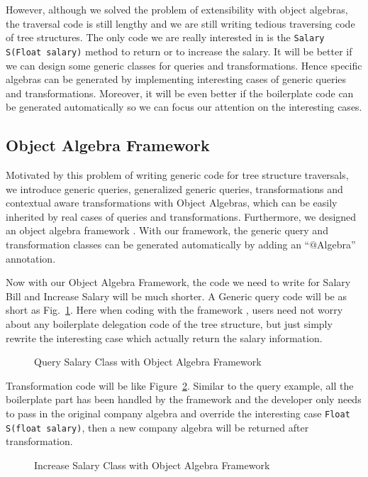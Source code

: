 However, although we solved the problem of extensibility with object algebras, the traversal code is still lengthy and we are still writing tedious traversing code of tree structures. The only code we are really interested in is the \lstinline{Salary S(Float salary)} method to return or to increase the salary. It will be better if we can design some generic classes for queries and transformations. Hence specific algebras can be generated by
implementing interesting cases of generic queries and
transformations. Moreover, it will be even better if the boilerplate code can be generated automatically so we can focus our attention on the interesting cases.

\subsection{Object Algebra Framework}
Motivated by this problem of writing generic code for tree structure
traversals, we introduce generic queries, generalized generic queries, transformations and contextual aware transformations with Object Algebras, which can be easily inherited by real cases of queries and transformations. Furthermore, we designed an object algebra framework \name. With our framework, the generic query and transformation classes can be generated automatically by adding an ``$@$Algebra'' annotation.

Now with our Object Algebra Framework, the code we need to write for Salary Bill and Increase Salary will be much shorter. A Generic query code will be as short as Fig.~\ref{query_with_oaframework}. Here when coding with the framework \name, users need not worry about any boilerplate delegation code of the tree structure, but just simply rewrite the interesting case which actually return the salary information.
\begin{figure}[tb]
\vspace{-.1in}
\caption{Query Salary Class with Object Algebra Framework}
\label{query_with_oaframework}
\end{figure}

Transformation code will be like Figure~\ref{transform_with_oaframework}. Similar to the query example, all the boilerplate part has been handled by the framework and the developer only needs to pass in the original company algebra and override the interesting case \lstinline{Float S(float salary)}, then a new company algebra will be returned after transformation.  
\begin{figure}[tb]
\vspace{-.1in}
\caption{Increase Salary Class with Object Algebra Framework}
\label{transform_with_oaframework}
\end{figure}

